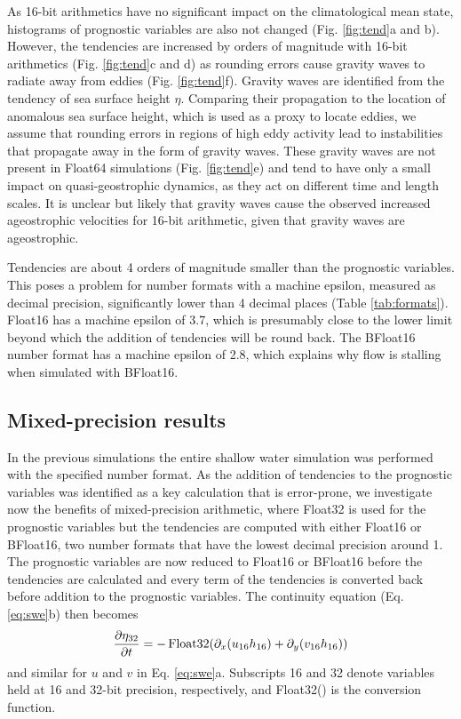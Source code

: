 As 16-bit arithmetics have no significant impact on the climatological mean state, histograms of prognostic variables are also not
changed (Fig. \ref{fig:tend}a and b). However, the tendencies are increased by orders of magnitude with 16-bit arithmetics
(Fig. \ref{fig:tend}c and d) as rounding errors cause gravity waves to radiate away from eddies (Fig. \ref{fig:tend}f). 
Gravity waves are identified from the tendency of sea surface height $\eta$. Comparing their propagation to the location of
anomalous sea surface height, which is used as a proxy to locate eddies, we assume that rounding errors in regions
of high eddy activity lead to instabilities that propagate away in the form of gravity waves. These gravity waves are not
present in Float64 simulations (Fig. \ref{fig:tend}e) and tend to have only a small impact on quasi-geostrophic dynamics,
as they act on different time and length scales. It is unclear but likely that gravity waves cause the observed increased
ageostrophic velocities for 16-bit arithmetic, given that gravity waves are ageostrophic.

Tendencies are about 4 orders of magnitude smaller than the prognostic variables. This poses a problem for number formats
with a machine epsilon, measured as decimal precision, significantly lower than 4 decimal places (Table \ref{tab:formats}).
Float16 has a machine epsilon of 3.7, which is presumably close to the lower limit beyond which the addition of tendencies
will be round back. The BFloat16 number format has a machine epsilon of 2.8, which explains why flow is stalling when
simulated with BFloat16.

\subsection{Mixed-precision results}
\label{sec:swm_results_mixed}

In the previous simulations the entire shallow water simulation was performed with the specified number format. As the addition
of tendencies to the prognostic variables was identified as a key calculation that is error-prone, we investigate now the benefits
of mixed-precision arithmetic, where Float32 is used for the prognostic variables but the tendencies are computed with either
Float16 or BFloat16, two number formats that have the lowest decimal precision around 1. The prognostic variables are now
reduced to Float16 or BFloat16 before the tendencies are calculated and every term of the tendencies is converted back before
addition to the prognostic variables. The continuity equation (Eq. \ref{eq:swe}b) then becomes
\begin{equation}
\frac{\partial \eta_{32}}{\partial t} = -\operatorname{Float32}( \partial_x(u_{16}h_{16})
+ \partial_y(v_{16}h_{16} ))
\label{eq:conversion}
\end{equation}
and similar for $u$ and $v$ in Eq. \ref{eq:swe}a. Subscripts 16 and 32 denote variables held at 16 and 32-bit precision, respectively,
and Float32() is the conversion function.

